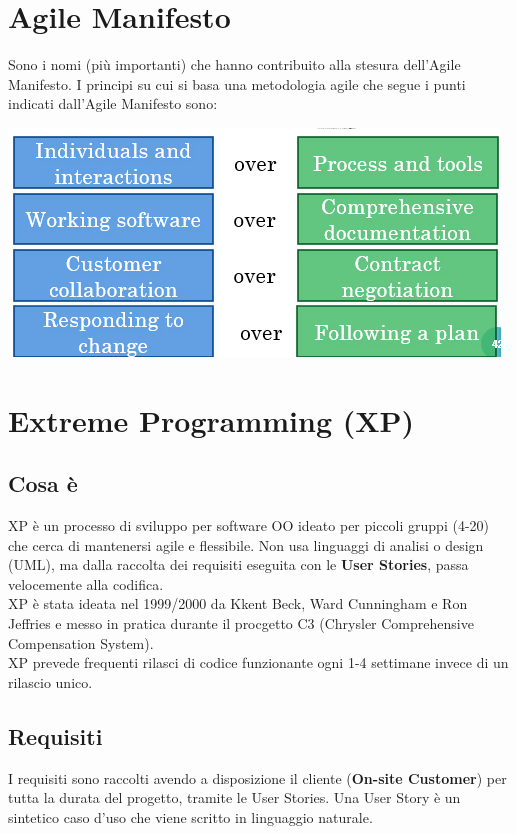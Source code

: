 \documentclass[12pt, a4paper]{report}
\begin{document}
\section{Agile Manifesto}
Sono i nomi (più importanti) che hanno contribuito alla stesura dell'Agile Manifesto. I principi su cui si basa una metodologia agile che segue i punti indicati dall'Agile Manifesto sono:
\begin{center}
    \includegraphics[width=.5\textwidth]{Immagini/agilemanifesto.png}
\end{center}
\section{Extreme Programming (XP)}
\subsection{Cosa è}
XP è un processo di sviluppo per software OO ideato per piccoli gruppi (4-20) che cerca di mantenersi agile e flessibile. Non usa linguaggi di analisi o design (UML), ma dalla raccolta dei requisiti eseguita con le \textbf{User Stories}, passa velocemente alla codifica.\\
XP è stata ideata nel 1999/2000 da Kkent Beck, Ward Cunningham e Ron Jeffries e messo in pratica durante il procgetto C3 (Chrysler Comprehensive Compensation System).\\
XP prevede frequenti rilasci di codice funzionante ogni 1-4 settimane invece di un rilascio unico.
\subsection{Requisiti}
I requisiti sono raccolti avendo a disposizione il cliente (\textbf{On-site Customer}) per tutta la durata del progetto, tramite le User Stories. Una User Story è un sintetico caso d'uso che viene scritto in linguaggio naturale. 
\end{document}
